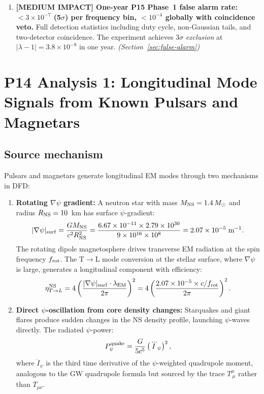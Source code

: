 \documentclass[11pt]{article}
\newcommand{\ee}[1]{\times 10^{#1}}
\newcommand{\lam}{\lambda}
\begin{document}
\begin{enumerate}
\item \textbf{[MEDIUM IMPACT] One-year P15 Phase~1 false alarm rate:
$< 3\ee{-7}$ (5$\sigma$) per frequency bin, $< 10^{-4}$ globally
with coincidence veto.}
Full detection statistics including duty cycle, non-Gaussian tails,
and two-detector coincidence. The experiment achieves $3\sigma$
\textit{exclusion} at $|\lam-1| = 3.8\ee{-8}$ in one year.
\emph{(Section~\ref{sec:false-alarm})}

\end{enumerate}

\section{P14 Analysis 1: Longitudinal Mode Signals from Known Pulsars
and Magnetars}
\label{sec:pulsar-signals}

\subsection{Source mechanism}

Pulsars and magnetars generate longitudinal EM modes through two
mechanisms in DFD:

\begin{enumerate}
\item \textbf{Rotating $\nabla\psi$ gradient:} A neutron star with
mass $M_{\rm NS} = 1.4\,M_\odot$ and radius $R_{\rm NS} = 10$~km
has surface $\psi$-gradient:
\begin{equation}
|\nabla\psi|_{\rm surf} = \frac{GM_{\rm NS}}{c^2 R_{\rm NS}^2}
= \frac{6.67\ee{-11} \times 2.79\ee{30}}{9\ee{16} \times 10^8}
= 2.07\ee{-5}\;\text{m}^{-1}.
\label{eq:grad-psi-NS}
\end{equation}
The rotating dipole magnetosphere drives transverse EM radiation at
the spin frequency $f_{\rm rot}$. The T$\to$L mode conversion at
the stellar surface, where $\nabla\psi$ is large, generates a
longitudinal component with efficiency:
\begin{equation}
\eta_{T\to L}^{\rm NS} = 4\left(\frac{|\nabla\psi|_{\rm surf}
\cdot \lambda_{\rm EM}}{2\pi}\right)^2
= 4\left(\frac{2.07\ee{-5} \times c/f_{\rm rot}}{2\pi}\right)^2.
\label{eq:eta-TL-NS}
\end{equation}

\item \textbf{Direct $\psi$-oscillation from core density changes:}
Starquakes and giant flares produce sudden changes in the NS density
profile, launching $\psi$-waves directly. The radiated $\psi$-power:
\begin{equation}
P_\psi^{\rm quake} = \frac{G}{5c^5}\left(\dddot{I}_\psi\right)^2,
\label{eq:P-psi-quake}
\end{equation}
where $\dddot{I}_\psi$ is the third time derivative of the
$\psi$-weighted quadrupole moment, analogous to the GW quadrupole
formula but sourced by the trace $T^\mu_{\ \mu}$ rather than
$T_{\mu\nu}$.
\end{enumerate}
\end{document}
